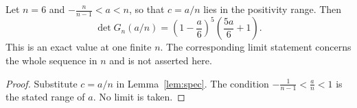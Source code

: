 \begin{theorem}\label{thm:main}
Let $n=6$ and $-\tfrac{n}{n-1}<a<n$, so that $c=a/n$ lies in the positivity range. Then
\[
\det G_n(a/n)=\left(1 - \frac{a}{6}\right)^{5} \left(\frac{5 a}{6} + 1\right).
\]
This is an exact value at one finite $n$. The corresponding limit statement concerns the whole sequence in $n$ and is not asserted here.
\end{theorem}
\begin{proof}
Substitute $c=a/n$ in Lemma~\ref{lem:spec}.
The condition $-\frac1{n-1}<\frac an<1$ is the stated range of $a$.
No limit is taken.
\end{proof}

